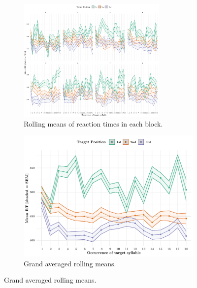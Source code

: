 \documentclass[11pt]{article}
\begin{document}
\begin{figure}[H]
		\begin{subfigure}{.4\textwidth}
		\centering
		\includegraphics[width=0.8\textwidth]{exp3fig3brolling.pdf}
		\caption{Rolling means of reaction times in each block.}
		\end{subfigure}
		\begin{subfigure}{.4\textwidth}
		\centering
		\includegraphics[width=\linewidth]{exp3fig3rolling.pdf}
		\caption{Grand averaged rolling means.}
	\end{subfigure}
	\label{fig:Fig. 2}
\end{figure}
\end{document}
